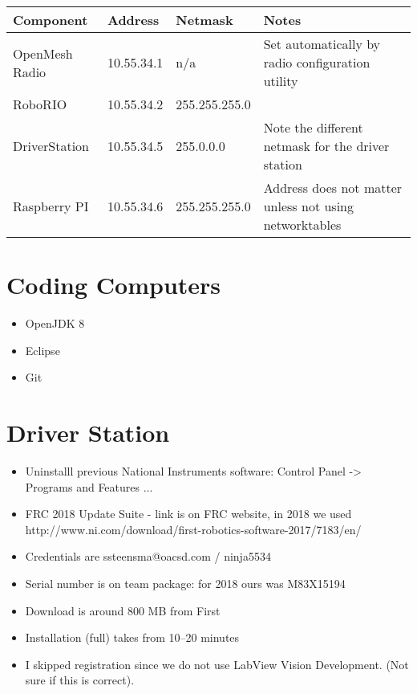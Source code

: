 	{\renewcommand{\arraystretch}{1.5}
	\begin{tabular}{ @{} l l l p{3in} }
	\textbf{Component} & \textbf{Address} & \textbf{Netmask} & \textbf{Notes} \\
	\midrule
	OpenMesh Radio & 10.55.34.1 & n/a & Set automatically by radio configuration utility \\
	RoboRIO        & 10.55.34.2 & 255.255.255.0 \\
	DriverStation  & 10.55.34.5 & 255.0.0.0     & Note the different netmask for the driver station \\
	Raspberry PI   & 10.55.34.6 & 255.255.255.0 & Address does not matter unless not using networktables \\
	\end{tabular}
	}




\newpage\section*{Coding Computers}

\begin{itemize}
\item OpenJDK 8
\item Eclipse
\item Git
\end{itemize}


\section*{Driver Station}
\begin{itemize}
\item Uninstalll previous National Instruments software: Control Panel -> Programs and Features ...
\item FRC 2018 Update Suite - link is on FRC website, in 2018 we used http://www.ni.com/download/first-robotics-software-2017/7183/en/
\item Credentials are ssteensma@oacsd.com / ninja5534
\item Serial number is on team package: for 2018 ours was M83X15194
\item Download is around 800 MB from First
\item Installation (full) takes from 10--20 minutes
\item I skipped registration since we do not use LabView Vision Development. (Not sure if this is correct).
\end{itemize}


